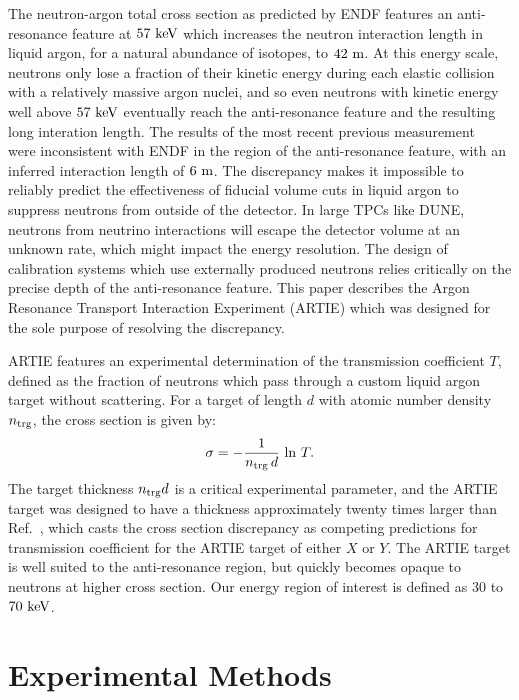 \documentclass[%
 reprint,
superscriptaddress,
 preprintnumbers,
 nofootinbib,
 nobibnotes,
 bibnotes,
 amsmath,amssymb,
 aps,
 prl, 
 floatfix,
]{revtex4-1}
\newcommand{\keV}{\mathrm{ke\kern -0.1em V}}
\begin{document}
The neutron-argon total cross section as predicted by ENDF features an
anti-resonance feature at $57~\keV$ which increases the neutron
interaction length in liquid argon, for a natural abundance of
isotopes, to $42~\rm m$.  At this energy scale, neutrons only lose a
fraction of their kinetic energy during each elastic collision with a
relatively massive argon nuclei, and so even neutrons with kinetic
energy well above $57~\rm keV$ eventually reach the anti-resonance
feature and the resulting long interation length.  The results of the
most recent previous measurement~\cite{Winters:1991} were inconsistent
with ENDF in the region of the anti-resonance feature, with an
inferred interaction length of $6~\rm m$.  The discrepancy makes it
impossible to reliably predict the effectiveness of fiducial volume
cuts in liquid argon to suppress neutrons from outside of the
detector.  In large TPCs like DUNE, neutrons from neutrino
interactions will escape the detector volume at an unknown rate, which
might impact the energy resolution.  The design of calibration systems
which use externally produced neutrons relies critically on the
precise depth of the anti-resonance feature.  This paper describes the
Argon Resonance Transport Interaction Experiment (ARTIE) which was
designed for the sole purpose of resolving the discrepancy.

ARTIE features an experimental determination of the transmission
coefficient $T$, defined as the fraction of neutrons which pass
through a custom liquid argon target without scattering.  For a
target of length $d$ with atomic number density $n_{\rm trg}$, the
cross section is given by:
\begin{equation}
  \sigma = -\frac{1}{n_{\rm trg} \, d} \, \ln \, T.
\label{eq:sigma}
\end{equation}
The target thickness $n_{\rm trg} d$ is a critical experimental
parameter, and the ARTIE target was designed to have a thickness
approximately twenty times larger than Ref.~\cite{Winters:1991}, which
casts the cross section discrepancy as competing predictions for
transmission coefficient for the ARTIE target of either
{\color{red} $X$ or $Y$}.
The ARTIE target is well suited to the anti-resonance region, but
quickly becomes opaque to neutrons at higher cross section.  Our
energy region of interest is defined as $30$ to $70~\rm keV$.

\section{\label{sec:setup}Experimental Methods}
\end{document}
